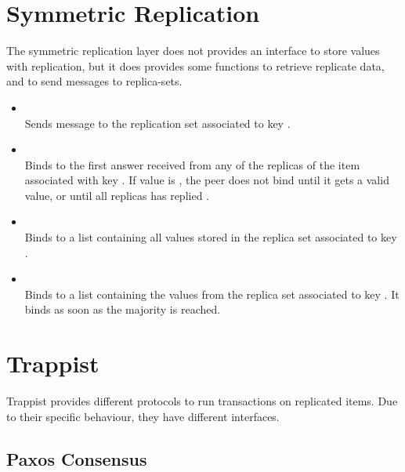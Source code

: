 \documentclass[11pt]{article}
\begin{document}
\section{Symmetric Replication}

The symmetric replication layer does not provides an interface to store values
with replication, but it does provides some functions to retrieve replicate
data, and to send messages to replica-sets.

\begin{itemize}

\item {}\\ Sends message  to the replication
set associated to key .

\item {}\\ Binds  to the first answer received
from any of the replicas of the item associated with key . If value
is , the peer does not bind  until it gets a valid
value, or until all replicas has replied . 

\item {}\\ Binds  to a list containing all
values stored in the replica set associated to key .

\item {}\\ Binds  to a list containing
the values from the replica set associated to key . It binds
 as soon as the majority is reached.

\end{itemize}

\section{Trappist}

Trappist provides different protocols to run transactions on replicated items.
Due to their specific behaviour, they have different interfaces.

\subsection{Paxos Consensus}
\end{document}
